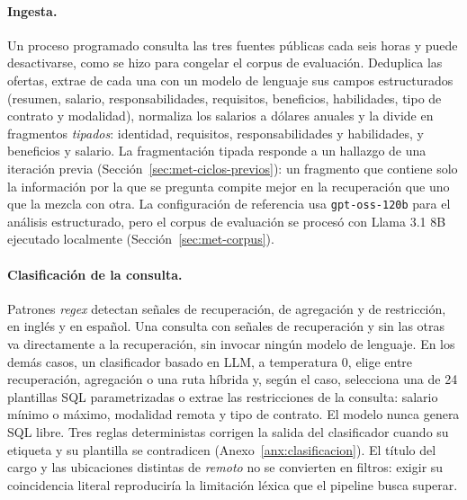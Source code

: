 \paragraph{Ingesta.}
\label{sec:art-ingesta}
Un proceso programado consulta las tres fuentes públicas cada seis horas y puede desactivarse, como se hizo para congelar el corpus de evaluación. Deduplica las ofertas, extrae de cada una con un modelo de lenguaje sus campos estructurados (resumen, salario, responsabilidades, requisitos, beneficios, habilidades, tipo de contrato y modalidad), normaliza los salarios a dólares anuales y la divide en fragmentos \emph{tipados}: identidad, requisitos, responsabilidades y habilidades, y beneficios y salario. La fragmentación tipada responde a un hallazgo de una iteración previa (Sección~\ref{sec:met-ciclos-previos}): un fragmento que contiene solo la información por la que se pregunta compite mejor en la recuperación que uno que la mezcla con otra. La configuración de referencia usa \texttt{gpt-oss-120b} para el análisis estructurado, pero el corpus de evaluación se procesó con Llama 3.1 8B ejecutado localmente (Sección~\ref{sec:met-corpus}).

\paragraph{Clasificación de la consulta.}
\label{sec:art-clasificacion}
Patrones \textit{regex} detectan señales de recuperación, de agregación y de restricción, en inglés y en español. Una consulta con señales de recuperación y sin las otras va directamente a la recuperación, sin invocar ningún modelo de lenguaje. En los demás casos, un clasificador basado en LLM, a temperatura 0, elige entre recuperación, agregación o una ruta híbrida y, según el caso, selecciona una de 24 plantillas SQL parametrizadas o extrae las restricciones de la consulta: salario mínimo o máximo, modalidad remota y tipo de contrato. El modelo nunca genera SQL libre. Tres reglas deterministas corrigen la salida del clasificador cuando su etiqueta y su plantilla se contradicen (Anexo~\ref{anx:clasificacion}). El título del cargo y las ubicaciones distintas de \textit{remoto} no se convierten en filtros: exigir su coincidencia literal reproduciría la limitación léxica que el pipeline busca superar.

